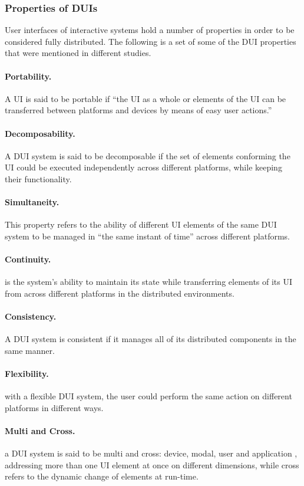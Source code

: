 \subsubsection{Properties of DUIs}
User interfaces of interactive systems hold a number of properties
in order to be considered fully distributed. The following is a set of
some of the DUI properties that were mentioned in different studies.

\paragraph{Portability.}  A UI is said to be portable if ``the UI as a whole or elements of the UI can be transferred between platforms and
devices by means of easy user actions.'' \cite{lopez2011formal}
\paragraph{Decomposability.} A DUI system is said to be decomposable if the set
of elements conforming the UI could be executed independently across different
platforms, while keeping their functionality.\cite{lopez2011formal}
\paragraph{Simultaneity.} This property refers to
the ability of different UI elements of the same DUI system to be managed in
``the same instant of time'' across different platforms.\cite{lopez2011formal}
\paragraph{Continuity.} is the system's ability to maintain
its state while transferring elements of its UI from across different platforms
in the distributed environments.\cite{lopez2011formal}
\paragraph{Consistency.} A DUI system is consistent if it manages all of its
distributed components in the same manner.\cite{lopez2011formal}
\paragraph{Flexibility.} with a flexible DUI system, the
user could perform the same action on different platforms in different
ways.\cite{lopez2011formal}
\paragraph{Multi and Cross.} a DUI system is said to be multi and cross:
device, modal, user and application  \cite{blumendorf2011distributed},
addressing more than one UI element at once on different dimensions, while cross
refers to the dynamic change of elements at run-time.

